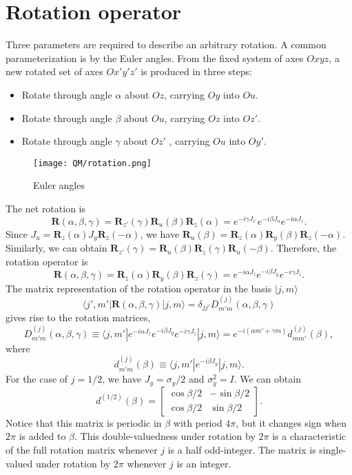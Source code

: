 \section{Rotation operator}
Three parameters are required to describe an arbitrary rotation. A common parameterization is by the Euler angles. From the fixed system of axes $Oxyz$, a new rotated set of axes $Ox'y'z'$ is produced in three steps:
\begin{itemize}
\item Rotate through angle $\alpha$ about $Oz$, carrying $Oy$ into $Ou$.
\item Rotate through angle $\beta$ about $Ou$, carrying $Oz$ into $Oz'$.
\item Rotate through angle $\gamma$ about $Oz'$ , carrying $Ou$ into $Oy'$.
\end{itemize}
\begin{figure}[!h]
	\centering
	\texttt{[image: QM/rotation.png]}
	\caption{Euler angles}
\end{figure}
The net rotation is
\[\bm{R}(\alpha,\beta,\gamma) = \bm{R}_{z'}(\gamma) \bm{R}_{u}(\beta) \bm{R}_{z}(\alpha) = e^{-i\gamma J_{z'}} e^{-i\beta J_{u}} e^{-i\alpha J_{z}}.\]
Since $J_u = \bm{R}_z(\alpha) J_y \bm{R}_z(-\alpha)$, we have $\bm{R}_u(\beta) = \bm{R}_z(\alpha) \bm{R}_y(\beta) \bm{R}_z(-\alpha)$. Similarly, we can obtain $\bm{R}_{z'}(\gamma) = \bm{R}_{u}(\beta) \bm{R}_z(\gamma) \bm{R}_u(-\beta)$. Therefore, the rotation operator is
\[\bm{R}(\alpha,\beta,\gamma) = \bm{R}_{z}(\alpha) \bm{R}_{y}(\beta) \bm{R}_{z}(\gamma) = e^{-i\alpha J_{z}} e^{-i\beta J_{y}} e^{-i\gamma J_{z}}.\]
The matrix representation of the rotation operator in the basis $|j,m\rangle$
\[\langle j',m' | \bm{R}(\alpha,\beta,\gamma) | j,m \rangle = \delta_{jj'} D_{m'm}^{(j)}(\alpha,\beta,\gamma)\]
gives rise to the rotation matrices,
\[D_{m'm}^{(j)}(\alpha,\beta,\gamma) \equiv \langle j,m' | e^{-i\alpha J_{z}} e^{-i\beta J_{y}} e^{-i\gamma J_{z}} | j,m \rangle = e^{-i(\alpha m' + \gamma m)} d_{mm'}^{(j)}(\beta),\]
where
\[ d_{m'm}^{(j)}(\beta) \equiv \langle j,m' | e^{-i\beta J_{y}} | j,m \rangle.\]
For the case of $j = 1/2$, we have $J_y = \sigma_y/2$ and $\sigma_y^2 = I$. We can obtain
\[d^{(1/2)}(\beta) = \left[ \begin{matrix} \cos {\beta}/{2} & -\sin {\beta}/{2} \\ \cos {\beta}/{2}& \sin {\beta}/{2}\end{matrix} \right] .\]
Notice that this matrix is periodic in $\beta$ with period $4\pi$, but it changes sign when $2\pi$ is added to $\beta$. This double-valuedness under rotation by $2\pi$ is a characteristic of the full rotation matrix whenever $j$ is a half odd-integer. The matrix is single-valued under rotation by $2\pi$ whenever $j$ is an integer.
